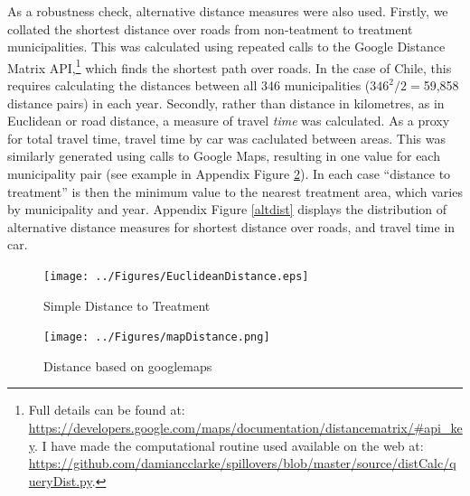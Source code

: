 \documentclass[11pt,subeqn]{article}
\begin{document}
\begin{spacing}{1.4}
As a robustness check, alternative distance measures were also used.
Firstly, we collated the shortest distance over roads from non-teatment to 
treatment municipalities.  This was calculated using repeated calls to the 
Google Distance Matrix API,\footnote{Full details can be found at:
\url{https://developers.google.com/maps/documentation/distancematrix/\#api\_key}.
I have made the computational routine used available on the web at:
\url{https://github.com/damiancclarke/spillovers/blob/master/source/distCalc/queryDist.py}.}
which finds the shortest path over roads.  In the case of Chile, this requires 
calculating the distances between all 346 municipalities ($346^2/2=$59,858
distance pairs) in each year.  Secondly, rather than distance in 
kilometres, as in Euclidean or road distance, a measure of travel \emph{time} 
was calculated.  As a proxy for total travel time, travel time by car was 
caclulated between areas.  This was similarly generated using calls to Google 
Maps, resulting in one value for each municipality pair (see example in Appendix
Figure \ref{googdist}).  In each case ``distance to treatment'' is then the 
minimum value to the nearest treatment area, which varies by municipality and 
year.  Appendix Figure \ref{altdist} displays the distribution of alternative
distance measures for shortest distance over roads, and travel time in car.

\begin{figure}[htpb!]
\texttt{[image: ../Figures/EuclideanDistance.eps]}
\caption{Simple Distance to Treatment}
\label{dist}
\end{figure}

\begin{figure}[htpb!]
\texttt{[image: ../Figures/mapDistance.png]}
\caption{Distance based on googlemaps}
\label{googdist}
\end{figure}


\end{spacing}
\end{document}
